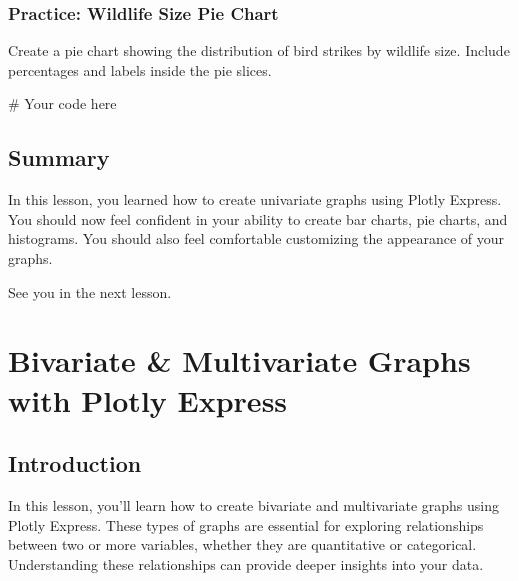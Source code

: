 \documentclass[
  letterpaper,
  DIV=11,
  numbers=noendperiod]{scrreprt}
\newenvironment{Shaded}{\begin{snugshade}}{\end{snugshade}}
\newcommand{\CommentTok}[1]{\textcolor[rgb]{0.37,0.37,0.37}{#1}}
\begin{document}
\begin{tcolorbox}[enhanced jigsaw, colframe=quarto-callout-tip-color-frame, opacityback=0, titlerule=0mm, bottomrule=.15mm, breakable, leftrule=.75mm, colbacktitle=quarto-callout-tip-color!10!white, title=\textcolor{quarto-callout-tip-color}{\faLightbulb}\hspace{0.5em}{Practice}, rightrule=.15mm, coltitle=black, opacitybacktitle=0.6, colback=white, left=2mm, arc=.35mm, toptitle=1mm, bottomtitle=1mm, toprule=.15mm]

\subsection{Practice: Wildlife Size Pie
Chart}\label{practice-wildlife-size-pie-chart}

Create a pie chart showing the distribution of bird strikes by wildlife
size. Include percentages and labels inside the pie slices.

\begin{Shaded}
\begin{Highlighting}[]
\CommentTok{\# Your code here}
\end{Highlighting}
\end{Shaded}

\end{tcolorbox}

\section{Summary}\label{summary}

In this lesson, you learned how to create univariate graphs using Plotly
Express. You should now feel confident in your ability to create bar
charts, pie charts, and histograms. You should also feel comfortable
customizing the appearance of your graphs.

See you in the next lesson.

\chapter{Bivariate \& Multivariate Graphs with Plotly
Express}\label{bivariate-multivariate-graphs-with-plotly-express}

\section{Introduction}\label{introduction-5}

In this lesson, you'll learn how to create bivariate and multivariate
graphs using Plotly Express. These types of graphs are essential for
exploring relationships between two or more variables, whether they are
quantitative or categorical. Understanding these relationships can
provide deeper insights into your data.
\end{document}

